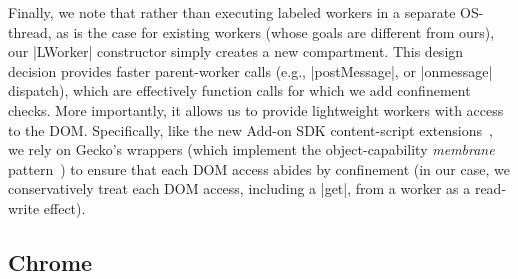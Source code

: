 %

Finally, we note that rather than executing labeled workers in a
separate OS-thread, as is the case for existing workers (whose goals
are different from ours), our \js|LWorker| constructor simply creates a new
compartment. This design decision provides 
%
faster parent-worker calls (e.g.,
\js|postMessage|, or \js|onmessage| dispatch), which are effectively function
calls for which we add confinement checks. 
%
More importantly, it allows us to provide lightweight workers with access to the
DOM.
%
Specifically, like the new Add-on SDK content-script
extensions~\cite{addon-sdk}, we rely on Gecko's wrappers (which implement the
object-capability \emph{membrane}
pattern~\cite{miller2003paradigm,miller2006robust}) to ensure that each DOM
access abides by confinement (in our case, we conservatively treat each DOM
access, including a \js|get|, from a worker as a read-write effect).
%

\subsection{Chrome}
\label{sec:implementation:firefox}




